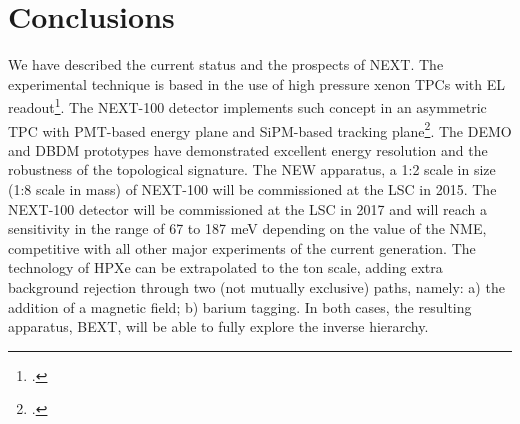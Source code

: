 \documentclass[a4paper,11pt,oneside]{article}
\begin{document}
\section{Conclusions}
We have described the current status and the prospects of NEXT. The experimental technique is based in the use of high pressure xenon TPCs with EL readout\footcite{Nygren:2009zz}. The NEXT-100 detector implements such concept in an asymmetric TPC with PMT-based energy plane and SiPM-based tracking plane\footcite{Alvarez:2012haa}. The DEMO and DBDM prototypes have demonstrated excellent energy resolution and the robustness of the topological signature. The NEW apparatus, a 1:2 scale in size (1:8 scale in mass) of NEXT-100 will be commissioned at the LSC in 2015. The NEXT-100 detector will be commissioned at the LSC in 2017 and will reach a sensitivity in the range of 67 to 187 meV depending on the value of the NME, competitive with all other major experiments of the current generation. The technology of HPXe can be extrapolated to the ton scale, adding extra background rejection through two (not mutually exclusive) paths, namely: a) the addition of a magnetic field; b) barium tagging. In both cases, the resulting apparatus, BEXT, will be able to fully explore the inverse hierarchy. 
\end{document}
